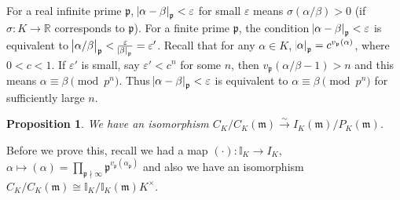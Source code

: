\documentclass[11pt]{article}
\theoremstyle{definition}
\theoremstyle{plain}
\newtheorem{proposition}[definition]{Proposition}
\theoremstyle{remark}
\newcommand{\II}{\mathbb{I}}
\newcommand{\RR}{\mathbb{R}}
\newcommand{\fp}{\mathfrak{p}}
\newcommand{\fm}{\mathfrak{m}}
\begin{document}
For a real infinite prime $\fp$, $\abs{\alpha - \beta}_\fp < \varepsilon$ for small $\varepsilon$ means $\sigma(\alpha / \beta) > 0$ (if $\sigma : K \to \RR$ corresponds to $\fp$). For a finite prime $\fp$, the condition $\abs{\alpha - \beta}_\fp < \varepsilon$ is equivalent to $\abs{\alpha / \beta}_\fp < \frac{\varepsilon}{\abs{\beta}_\fp} = \varepsilon'$. Recall that for any $\alpha \in K$, $\abs{\alpha}_\fp = c^{v_\fp(\alpha)}$, where $0 < c < 1$. If $\varepsilon'$ is small, say $\varepsilon' < c^n$ for some $n$, then $v_\fp(\alpha/\beta - 1) > n$ and this means $\alpha \equiv \beta \pmod{p^n}$. Thus $\abs{\alpha - \beta}_\fp < \varepsilon$ is equivalent to $\alpha \equiv \beta \pmod{p^n}$ for sufficiently large $n$.

\begin{proposition}\label{prop:10_2}
    We have an isomorphism $C_K/C_K(\fm) \xrightarrow{\sim} I_K(\fm) / P_K(\fm)$.
\end{proposition}

Before we prove this, recall we had a map $(\cdot) : \II_K \to I_K$, $\alpha \mapsto (\alpha) = \prod_{\fp \nmid \infty} \fp^{v_\fp(\alpha_\fp)}$ and also we have an isomorphism $C_K/C_K(\fm) \cong \II_K / \II_K(\fm)K^\times$.
\end{document}
